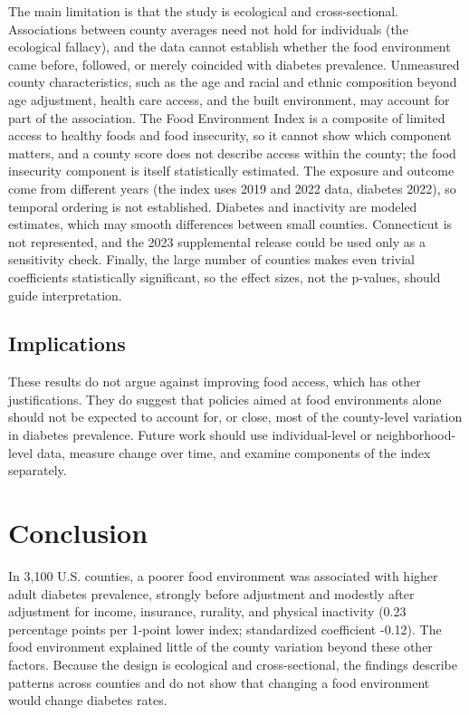 \documentclass[12pt]{article}
\begin{document}
The main limitation is that the study is ecological and cross-sectional. Associations between county averages need not hold for individuals (the ecological fallacy), and the data cannot establish whether the food environment came before, followed, or merely coincided with diabetes prevalence. Unmeasured county characteristics, such as the age and racial and ethnic composition beyond age adjustment, health care access, and the built environment, may account for part of the association. The Food Environment Index is a composite of limited access to healthy foods and food insecurity, so it cannot show which component matters, and a county score does not describe access within the county; the food insecurity component is itself statistically estimated. The exposure and outcome come from different years (the index uses 2019 and 2022 data, diabetes 2022), so temporal ordering is not established. Diabetes and inactivity are modeled estimates, which may smooth differences between small counties. Connecticut is not represented, and the 2023 supplemental release could be used only as a sensitivity check. Finally, the large number of counties makes even trivial coefficients statistically significant, so the effect sizes, not the p-values, should guide interpretation.

\subsection*{Implications}
These results do not argue against improving food access, which has other justifications. They do suggest that policies aimed at food environments alone should not be expected to account for, or close, most of the county-level variation in diabetes prevalence. Future work should use individual-level or neighborhood-level data, measure change over time, and examine components of the index separately.

\section*{Conclusion}
In 3,100 U.S. counties, a poorer food environment was associated with higher adult diabetes prevalence, strongly before adjustment and modestly after adjustment for income, insurance, rurality, and physical inactivity (0.23 percentage points per 1-point lower index; standardized coefficient -0.12). The food environment explained little of the county variation beyond these other factors. Because the design is ecological and cross-sectional, the findings describe patterns across counties and do not show that changing a food environment would change diabetes rates.
\end{document}
